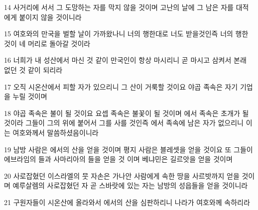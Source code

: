 \par 14 사거리에 서서 그 도망하는 자를 막지 않을 것이며 고난의 날에 그 남은 자를 대적에게 붙이지 않을 것이니라
\par 15 여호와의 만국을 벌할 날이 가까왔나니 너의 행한대로 너도 받을것인즉 너의 행한 것이 네 머리로 돌아갈 것이라
\par 16 너희가 내 성산에서 마신 것 같이 만국인이 항상 마시리니 곧 마시고 삼켜서 본래 없던 것 같이 되리라
\par 17 오직 시온산에서 피할 자가 있으리니 그 산이 거룩할 것이요 야곱 족속은 자기 기업을 누릴 것이며
\par 18 야곱 족속은 불이 될 것이요 요셉 족속은 불꽃이 될 것이며 에서 족속은 초개가 될 것이라 그들이 그의 위에 붙어서 그를 사를 것인즉 에서 족속에 남은 자가 없으리니 이는 여호와께서 말씀하셨음이니라
\par 19 남방 사람은 에서의 산을 얻을 것이며 평지 사람은 블레셋을 얻을 것이요 또 그들이 에브라임의 들과 사마리아의 들을 얻을 것 이며 베냐민은 길르앗을 얻을 것이며
\par 20 사로잡혔던 이스라엘의 뭇 자손은 가나안 사람에게 속한 땅을 사르밧까지 얻을 것이며 예루살렘의 사로잡혔던 자 곧 스바랏에 있는 자는 남방의 성읍들을 얻을 것이니라
\par 21 구원자들이 시온산에 올라와서 에서의 산을 심판하리니 나라가 여호와께 속하리라


